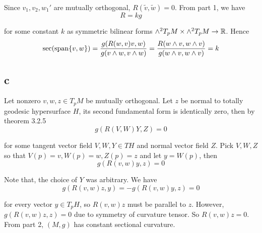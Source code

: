 Since $v_1, v_2, w_1'$ are mutually orthogonal, $R(\tilde{v}, \tilde{w}) = 0$. From part 1, we have 
$$
	R = k g
$$

for some constant $k$ as symmetric bilinear forms $\wedge^2 T_p M \times \wedge^2 T_p M \to \mathbb{R}$. Hence
$$
	\sec(\operatorname{span} \{v, w\}) = \frac{g(R(w, v) v, w)}{g(v \wedge w, v \wedge w)} = \frac{R(w \wedge v, w \wedge v)}{g(w \wedge v, w \wedge v)} = k
$$

\subsection{c}

Let nonzero $v, w, z \in T_p M$ be mutually orthogonal. Let $z$ be normal to totally geodesic hypersurface $H$, its second fundamental form is identically zero, then by theorem 3.2.5
$$
	g(R(V, W)Y, Z) = 0
$$

for some tangent vector field $V, W, Y \in TH$ and normal vector field $Z$. Pick $V, W, Z$ so that $V(p) = v, W(p) = w, Z(p) = z$ and let $y = W(p)$, then
$$
	g(R(v, w)y, z) = 0
$$

Note that, the choice of $Y$ was arbitrary. We have
$$
	g(R(v, w)z, y) = - g(R(v, w)y, z) = 0
$$

for every vector $y \in T_p H$, so $R(v, w)z$ must be parallel to $z$. However, $g(R(v, w)z, z) = 0$ due to symmetry of curvature tensor. So $R(v, w)z = 0$. From part 2, $(M, g)$ has constant sectional curvature.









